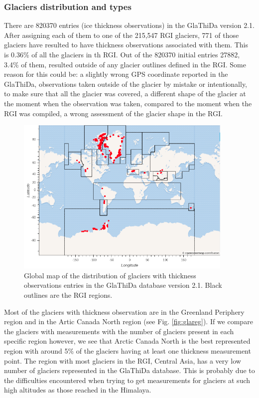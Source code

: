 \subsubsection{Glaciers distribution and types}
There are 820370 entries (ice thickness observations) in the GlaThiDa version 2.1. After assigning each of them to one of the 215,547 RGI glaciers, 771 of those glaciers have resulted to have thickness observations associated with them. This is 0.36\% of all the glaciers in th RGI. Out of the 820370 initial entries 27882, 3.4\% of them, resulted outside of any glacier outlines defined in the RGI. Some reason for this could be: a slightly wrong GPS coordinate reported in the GlaThiDa, observations taken outside of the glacier by mistake or intentionally, to make sure that all the glacier was covered, a different shape of the glacier at the moment when the observation was taken, compared to the moment when the RGI was compiled, a wrong assessment of the glacier shape in the RGI.
\begin{figure}[tp]\label{glathidamap} 
	\centering 
	\includegraphics[width=0.93\textwidth]{./figures/GlaThiDa_map.png}
	\caption{Global map of the distribution of glaciers with thickness observations entries in the GlaThiDa database version 2.1. Black outlines are the RGI regions.}
\end{figure}

Most of the glaciers with thickness observation are in the Greenland Periphery region and in the Artic Canada North region (see Fig. \ref{fig:glareg}). If we compare the glaciers with measurements with the number of glaciers present in each specific region however, we see that Arctic Canada North is the best represented region with around 5\% of the glaciers having at least one thickness measurement point. The region with most glaciers in the RGI, Central Asia, has a very low number of glaciers represented in the GlaThiDa database. This is probably due to the difficulties encountered when trying to get measurements for glaciers at such high altitudes as those reached in the Himalaya.


